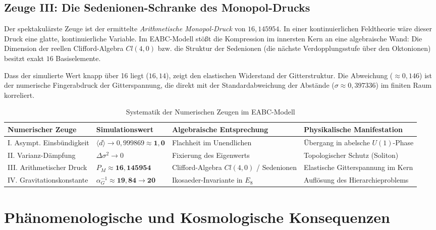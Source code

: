 \documentclass[11pt,a4paper]{article}
\newcommand{\Eoct}{E_8}
\begin{document}
\subsection{Zeuge III: Die Sedenionen-Schranke des Monopol-Drucks}
Der spektakulärste Zeuge ist der ermittelte \textit{Arithmetische Monopol-Druck} von $16{,}145954$. In einer kontinuierlichen Feldtheorie wäre dieser Druck eine glatte, kontinuierliche Variable. Im EABC-Modell stößt die Kompression im innersten Kern an eine algebraische Wand: Die Dimension der reellen Clifford-Algebra $Cl(4,0)$ bzw. die Struktur der Sedenionen (die nächste Verdopplungsstufe über den Oktonionen) besitzt exakt $16$ Basiselemente. 

Dass der simulierte Wert knapp über 16 liegt ($16{,}14$), zeigt den elastischen Widerstand der Gitterstruktur. Die Abweichung ($\approx 0{,}146$) ist der numerische Fingerabdruck der Gitterspannung, die direkt mit der Standardabweichung der Abstände ($\sigma \approx 0{,}397336$) im finiten Raum korreliert.

\begin{table}[htbp]
\centering
\caption{Systematik der Numerischen Zeugen im EABC-Modell}
\vspace{2mm}
\begin{tabular}{llll}
\toprule
\textbf{Numerischer Zeuge} & \textbf{Simulationswert} & \textbf{Algebraische Entsprechung} & \textbf{Physikalische Manifestation} \\
\midrule
I. Asympt. Einsbündigkeit & $\langle d \rangle \rightarrow 0{,}999869 \approx \mathbf{1{,}0}$ & Flachheit im Unendlichen & Übergang in abelsche $U(1)$-Phase \\
II. Varianz-Dämpfung & $\Delta\sigma^2 \rightarrow 0$ & Fixierung des Eigenwerts & Topologischer Schutz (Soliton) \\
III. Arithmetischer Druck & $P_M \approx \mathbf{16{,}145954}$ & Clifford-Algebra $Cl(4,0)$ / Sedenionen & Elastische Gitterspannung im Kern \\
IV. Gravitationskonstante & $\alpha_G^{-1} \approx \mathbf{19{,}84} \rightarrow \mathbf{20}$ & Ikosaeder-Invariante in $\Eoct$ & Auflösung des Hierarchieproblems \\
\bottomrule
\end{tabular}
\end{table}

\section{Phänomenologische und Kosmologische Konsequenzen}
\end{document}
